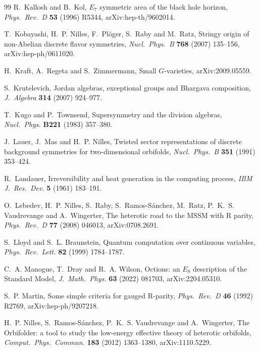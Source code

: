 \begin{thebibliography}{99}
 R.~Kallosh and B.~Kol, $E_7$ symmetric area of the black hole horizon,
\emph{Phys.\ Rev.\ D} \textbf{53} (1996) R5344, arXiv:hep-th/9602014.

 T.~Kobayashi, H.~P. Nilles, F.~Pl\"oger, S.~Raby and M.~Ratz, Stringy origin of non-Abelian
discrete flavor symmetries, \emph{Nucl.\ Phys.\ B} \textbf{768} (2007) 135--156, arXiv:hep-ph/0611020.

 H.~Kraft, A.~Regeta and S.~Zimmermann, Small $G$-varieties,
arXiv:2009.05559.

 S.~Krutelevich, Jordan algebras, exceptional groups and Bhargava
composition, \emph{J.\ Algebra} \textbf{314} (2007) 924--977.

 T.~Kugo and P.~Townsend, Supersymmetry and the division algebras,
\emph{Nucl.\ Phys.} \textbf{B221} (1983) 357--380.

 J.~Lauer, J.~Mas and H.~P. Nilles, Twisted sector representations of discrete
background symmetries for two-dimensional orbifolds, \emph{Nucl.\ Phys.\ B} \textbf{351} (1991) 353--424.

 R.~Landauer, Irreversibility and heat generation in the computing
process, \emph{IBM J.\ Res.\ Dev.} \textbf{5} (1961) 183--191.

 O.~Lebedev, H.~P. Nilles, S.~Raby, S.~Ramos-S\'anchez, M.~Ratz,
P.~K.~S. Vaudrevange and A.~Wingerter, The heterotic road to the MSSM with R parity,
\emph{Phys.\ Rev.\ D} \textbf{77} (2008) 046013, arXiv:0708.2691.

 S.~Lloyd and S.~L. Braunstein, Quantum computation over
continuous variables, \emph{Phys.\ Rev.\ Lett.} \textbf{82} (1999) 1784--1787.

 C.~A. Manogue, T.~Dray and R.~A. Wilson, Octions: an $E_8$ description of
the Standard Model, \emph{J.\ Math.\ Phys.} \textbf{63} (2022) 081703, arXiv:2204.05310.

 S.~P. Martin, Some simple criteria for gauged R-parity, \emph{Phys.\
Rev.\ D} \textbf{46} (1992) R2769, arXiv:hep-ph/9207218.

 H.~P. Nilles, S.~Ramos-S\'anchez, P.~K.~S. Vaudrevange and
A.~Wingerter, The Orbifolder: a tool to study the low-energy effective theory of heterotic
orbifolds, \emph{Comput.\ Phys.\ Commun.} \textbf{183} (2012) 1363--1380, arXiv:1110.5229.


\end{thebibliography}
